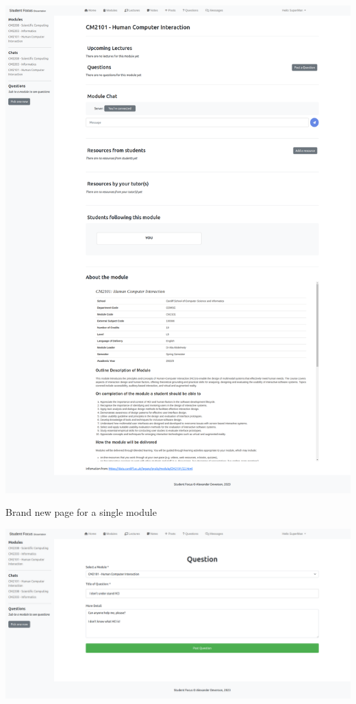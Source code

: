 \includegraphics[scale=0.20]{images/application/8 - modules_single_empty.png}

Brand new page for a single module

\includegraphics[scale=0.20]{images/application/9 - new question.png}

